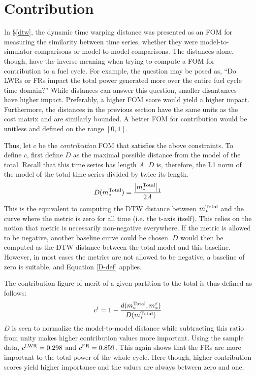 \clearpage
\section{Contribution}
\label{contribution}

In \S\ref{dtw}, the dynamic time warping distance was presented as an
FOM for measuring the similarity between time series, whether they 
were model-to-simulator comparisons or model-to-model comparisons.
The distances alone, though, have the inverse meaning when trying to 
compute a FOM for contribution to a fuel cycle.  For example, the 
question may be posed as, ``Do LWRs or FRs impact the total power generated 
more over the entire fuel cycle time domain?'' 
While distances can answer this question, smaller 
disantances have higher impact. Preferably, a higher FOM score would yield a 
higher impact. Furthermore, the distances in the previous section have
the same units as the cost matrix and are similarly bounded. A better 
FOM for contribution would be unitless and defined on the range $[0,1]$.

Thus, let $c$ be the \emph{contribution} FOM that satisfies the above 
constraints. To define $c$, first define $D$ as the maximal possible 
distance from the model of the total. Recall that this time series has length $A$.
$D$ is, therefore, the L1 norm of the model of the total time series divided
by twice its length. 
\begin{equation}
\label{D-def}
D(m_*^{\mathrm{Total}}) = \frac{\left|m_*^{\mathrm{Total}}\right|_1}{2A}
\end{equation}
This is the equivalent to computing the DTW distance
between $m_*^{\mathrm{Total}}$ and the curve where the metric is zero for all time 
(i.e. the t-axis itself).  This relies on the notion that 
metric is necessarily non-negative everywhere.  If the metric is allowed to 
be negative, another baseline curve could be chosen. $D$ would then be 
computed as the DTW distance between the total model and this baseline.
However, in most cases the metrics are not allowed to be negative, 
a baseline of zero is suitable, and Equation \ref{D-def} applies.

The contribution figure-of-merit of a given partition to the total is thus 
defined as follows:
\begin{equation}
\label{cont}
c^i = 1 - \frac{d(m_*^{\mathrm{Total}}, m_*^i)}{D(m_*^{\mathrm{Total}})}
\end{equation}
$D$ is seen to normalize the model-to-model distance while subtracting this
ratio from unity makes higher contribution values more important.  
Using the sample data, $c^{\mathrm{LWR}} = 0.298$ and $c^{\mathrm{FR}} = 0.859$. This again shows
that the FRs are more important to the total power of the whole cycle.
Here though, higher contribution scores yield higher importance and the values
are always between zero and one.

